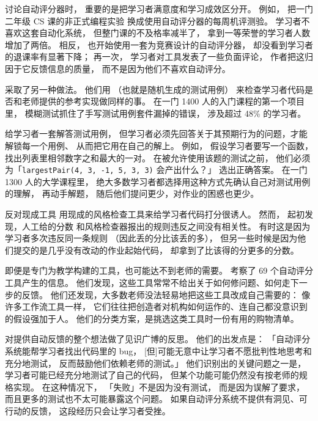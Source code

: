讨论自动评分器时，
重要的是把学习者满意度和学习成效区分开。
例如，
\cite{Magu2018}把一门二年级 CS 课的非正式编程实验
换成使用自动评分器的每周机评测验。
学习者不喜欢这套自动化系统，
但整门课的不及格率减半了，
拿到一等荣誉的学习者人数增加了两倍。
相反，
\cite{Rubi2014}也开始使用一套为竞赛设计的自动评分器，
却没看到学习者的退课率有显著下降；
再一次，
学习者对工具发表了一些负面评论，
作者把这归因于它反馈信息的质量，
而不是因为他们不喜欢自动评分。

\cite{Srid2016}采取了另一种做法。
他们用
（也就是随机生成的测试用例）
来检查学习者代码是否和老师提供的参考实现做同样的事。
在一门 1400 人的入门课程的第一个项目里，
模糊测试抓住了手写测试用例套件漏掉的错误，
涉及超过 48\% 的学习者。

\cite{Basu2015}给学习者一套解答测试用例，
但学习者必须先回答关于其预期行为的问题，才能解锁每一个用例、
从而把它用在自己的解上。
例如，
假设学习者要写一个函数，找出列表里相邻数字之和最大的一对。
在被允许使用该题的测试之前，
他们必须为「\texttt{largestPair(4, 3, -1, 5, 3, 3)} 会产出什么？」
选出正确答案。
在一门 1300 人的大学课程里，
绝大多数学习者都选择用这种方式先确认自己对测试用例的理解，
再动手解题，
随后他们提问更少，对作业的困惑也更少。

\begin{aside}{反对现成工具}
  用现成的风格检查工具来给学习者代码打分很诱人。
  然而，
  \cite{Nutb2016}起初发现，人工给的分数
  和风格检查器报出的规则违反之间没有相关性。
  有时这是因为学习者多次违反同一条规则
  （因此丢的分比该丢的多），
  但另一些时候是因为他们提交的是几乎没有改动的作业起始代码，
  却拿到了比该得的分更多的分数。

  即便是专门为教学构建的工具，也可能达不到老师的需要。
  \cite{Keun2016a,Keun2016b}考察了 69 个自动评分工具产生的信息。
  他们发现，这些工具常常不给出关于如何修问题、如何走下一步的反馈。
  他们还发现，大多数老师没法轻易地把这些工具改成自己需要的：
  像许多工作流工具一样，
  它们往往把创造者对机构如何运作的、连自己都没意识到的假设强加于人。
  他们的分类方案，是挑选这类工具时一份有用的购物清单。
\end{aside}

\cite{Buff2015}对提供自动反馈的整个想法做了见识广博的反思。
他们的出发点是：
「自动评分系统能帮学习者找出代码里的 bug，
[但]可能无意中让学习者不愿批判性地思考和充分地测试，
反而鼓励他们依赖老师的测试。」
他们识别出的关键问题之一是，
学习者可能已经充分地测试了自己的代码，
但某个功能可能仍然没有按老师的规格实现。
在这种情况下，
「失败」不是因为没有测试，
而是因为误解了要求，
而且更多的测试也不太可能暴露这个问题。
如果自动评分系统不提供有洞见、可行动的反馈，
这段经历只会让学习者受挫。

